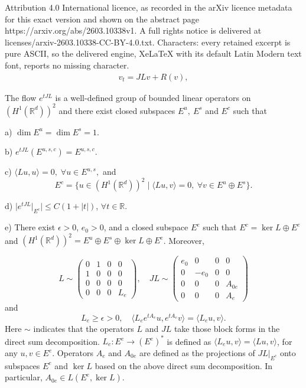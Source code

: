 \documentclass[10pt,a4paper]{amsart}
\newcommand{\R}{\mathbb R}
\begin{document}
Attribution 4.0 International licence, as recorded in the arXiv licence metadata for this exact version and shown on the abstract page https://arxiv.org/abs/2603.10338v1. A full rights notice is delivered at licenses/arxiv-2603.10338-CC-BY-4.0.txt. Characters: every retained excerpt is pure ASCII, so the delivered engine, XeLaTeX with its default Latin Modern text font, reports no missing character.
\begin{align}\label{1102}
v_t=JL v+R(v),
\end{align}

\begin{proposition}\label{prop:linzeng}
The flow $e^{tJL}$ is a well-defined group of bounded linear operators on $(H^1(\R^d))^2$ and there exist closed subspaces $E^u,\ E^s$ and $E^c$ such that 

a) 
$\dim E^u=\dim E^s=1$.

b) $e^{tJL}(E^{u,s,c})=E^{u,s,c}$.

c) $ \langle Lu, u\rangle =0, \; \forall u\in E^{u,s},$ and $$E^c=\{u\in (H^1(\R^d))^2 \mid \langle Lu, v\rangle=0, \ \forall v\in E^u\oplus E^s\}.$$


d) $\bigl |e^{tJL}|_{E^c}\big|\le C(1+|t|)$, $\forall t\in \mathbb R $.

e) There exist $\epsilon >0$, $e_0>0$, and a closed subspace $E^e$ such that $E^c=\ker L\oplus E^e$ and $(H^1(\R^d))^2=E^u\oplus E^s\oplus \ker L \oplus E^e$. Moreover,  

$$L\sim 
\begin{pmatrix} 0 & 1 & 0 & 0\\
1&0&0&0\\
0&0&0&0\\
0&0&0&L_e
\end{pmatrix}, \quad 
JL\sim \begin{pmatrix}
e_0 &0&0&0\\
0&-e_0 &0&0\\
0&0&0&A_{0e}\\
0&0&0&A_e
\end{pmatrix}
$$
and 
$$
L_e\ge \epsilon>0, \quad \langle L_e e^{tA_e}u, e^{tA_e}v\rangle=\langle L_e u, v\rangle.
$$   
Here $\sim$ indicates that the operators $L$ and $JL$ take those block forms in the direct sum decomposition. $L_e: E^e\to (E^e)^*$ is defined as $\langle L_e u, v\rangle=\langle Lu, v\rangle$, for any $u, v\in E^e$. Operators $A_e$ and $A_{0e}$ are defined as the projections of $JL|_{E^c}$ onto subspaces $E^e$ and   $\ker L$ based on the above direct sum decomposition. In particular, $A_{0e} \in L(E^e, \ker L)$.      
\end{proposition}
\end{document}
